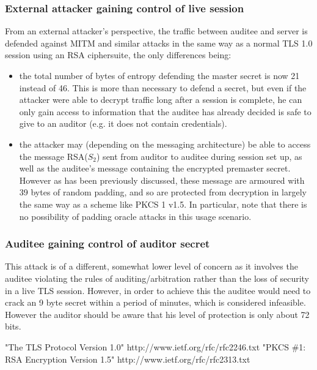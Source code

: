 \documentclass[10pt,a4paper]{article}
\begin{document}
\subsubsection{External attacker gaining control of live session}

\noindent From an external attacker's perspective, the traffic between auditee and server is defended against MITM and similar attacks in the same way as a normal TLS 1.0 session using an RSA ciphersuite, the only differences being: 
\begin{itemize}
\item the total number of bytes of entropy defending the master secret is now 21 instead of 46. This is more than necessary to defend a secret, but even if the attacker were able to decrypt traffic long after a session is complete, he can only gain access to information that the auditee has already decided is safe to give to an auditor (e.g. it does not contain credentials).
\item the attacker may (depending on the messaging architecture) be able to access the message RSA($S_2$) sent from auditor to auditee during session set up, as well as the auditee's message containing the encrypted premaster secret. However as has been previously discussed, these message are armoured with 39 bytes of random padding, and so are protected from decryption in largely the same way as a scheme like PKCS 1 v1.5. In particular, note that there is no possibility of padding oracle attacks in this usage scenario. 
\end{itemize}

\subsubsection{Auditee gaining control of auditor secret}
This attack is of a different, somewhat lower level of concern as it involves the auditee violating the rules of auditing/arbitration rather than the loss of security in a live TLS session. However, in order to achieve this the auditee would need to crack an 9 byte secret within a period of minutes, which is considered infeasible. However the auditor should be aware that his level of protection is only about 72 bits.

\pagebreak

 \begin{thebibliography}{1}

   "The TLS Protocol Version 1.0" http://www.ietf.org/rfc/rfc2246.txt
   "PKCS \#1: RSA Encryption Version 1.5" \newline http://www.ietf.org/rfc/rfc2313.txt

  \end{thebibliography}
  
\end{document}
